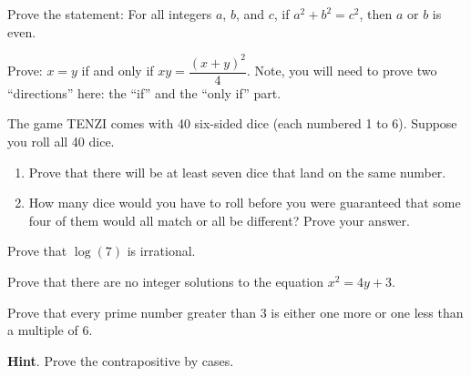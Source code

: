 \documentclass[10pt,]{book}
\theoremstyle{plain}
\theoremstyle{definition}
\theoremstyle{definition}
\theoremstyle{definition}
\theoremstyle{definition}
\numberwithin{equation}{chapter}
\begin{document}
\begin{divisionexercise}{9}\hypertarget{exercise-244}{}
\hypertarget{p-2052}{}%
Prove the statement: For all integers \(a\), \(b\), and \(c\), if \(a^2 + b^2 = c^2\), then \(a\) or \(b\) is even.%
\end{divisionexercise}%
\begin{divisionexercise}{10}\hypertarget{exercise-245}{}
\hypertarget{p-2053}{}%
Prove: \(x=y\) if and only if \(xy=\dfrac{(x+y)^2}{4}\). Note, you will need to prove two ``directions'' here: the ``if'' and the ``only if'' part.%
\end{divisionexercise}%
\begin{divisionexercise}{11}\hypertarget{exercise-246}{}
\hypertarget{p-2054}{}%
The game TENZI comes with 40 six-sided dice (each numbered 1 to 6). Suppose you roll all 40 dice. \leavevmode%
\begin{enumerate}[label=(\alph*)]
\item\hypertarget{li-710}{}Prove that there will be at least seven dice that land on the same number.%
\item\hypertarget{li-711}{}\hypertarget{p-2055}{}%
How many dice would you have to roll before you were guaranteed that some four of them would all match or all be different? Prove your answer.%
\end{enumerate}
%
\end{divisionexercise}%
\begin{divisionexercise}{12}\hypertarget{exercise-247}{}
\hypertarget{p-2061}{}%
Prove that \(\log(7)\) is irrational.%
\end{divisionexercise}%
\begin{divisionexercise}{13}\hypertarget{exercise-248}{}
\hypertarget{p-2066}{}%
Prove that there are no integer solutions to the equation \(x^2 = 4y + 3\).%
\end{divisionexercise}%
\begin{divisionexercise}{14}\hypertarget{exercise-249}{}
\hypertarget{p-2067}{}%
Prove that every prime number greater than 3 is either one more or one less than a multiple of 6.%
\par\smallskip%
\noindent\textbf{Hint}.\hypertarget{hint-73}{}\quad%
\hypertarget{p-2068}{}%
Prove the contrapositive by cases.%
\end{divisionexercise}%
\end{document}
